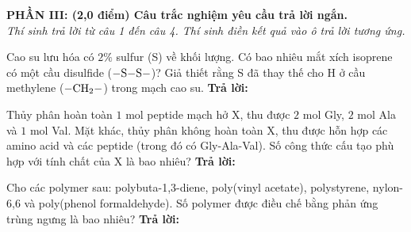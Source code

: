 \documentclass[11pt,a4paper]{article}
\begin{document}
\vspace{4pt}
\noindent
{\color{mainGreen}\textbf{\large PHẦN III: (2,0 điểm) Câu trắc nghiệm yêu cầu trả lời ngắn.}}\\
\textit{\small Thí sinh trả lời từ câu 1 đến câu 4. Thí sinh điền kết quả vào ô trả lời tương ứng.}
\vspace{2pt}

\begin{ex}
Cao su lưu hóa có $2\%$ sulfur (S) về khối lượng. Có bao nhiêu mắt xích isoprene có một cầu disulfide ($\ce{-S-S-}$)? Giả thiết rằng S đã thay thế cho H ở cầu methylene ($-\ce{CH2}-$) trong mạch cao su.
\hfill \textbf{Trả lời:} \dotfill

\end{ex}
\begin{ex}
Thủy phân hoàn toàn $1\text{ mol}$ peptide mạch hở X, thu được $2\text{ mol}$ Gly, $2\text{ mol}$ Ala và $1\text{ mol}$ Val. Mặt khác, thủy phân không hoàn toàn X, thu được hỗn hợp các amino acid và các peptide (trong đó có Gly-Ala-Val). Số công thức cấu tạo phù hợp với tính chất của X là bao nhiêu?
\hfill \textbf{Trả lời:} \dotfill

\end{ex}
\begin{ex}
Cho các polymer sau: polybuta-1,3-diene, poly(vinyl acetate), polystyrene, nylon-6,6 và poly(phenol formaldehyde). Số polymer được điều chế bằng phản ứng trùng ngưng là bao nhiêu?
\hfill \textbf{Trả lời:} \dotfill

\end{ex}
\end{document}
